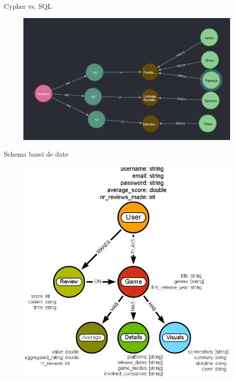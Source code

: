 \documentclass{beamer}
\begin{document}
\begin{frame}[fragile]{Cypher vs. SQL}
    \begin{figure}[H]
        \centering
        \begin{adjustbox}{max size={\textwidth}{\textheight}}
        \includegraphics[scale = 0.4]{exemplu_3}
        \end{adjustbox}
    \end{figure}
\end{frame}

\begin{frame}{Schema bazei de date}
    \begin{figure}[H]
        \centering
        \begin{adjustbox}{max size={\textwidth}{\textheight}}
        \includegraphics[scale = 0.3]{exemplu_4}
        \end{adjustbox}
    \end{figure}
\end{frame}
\end{document}
